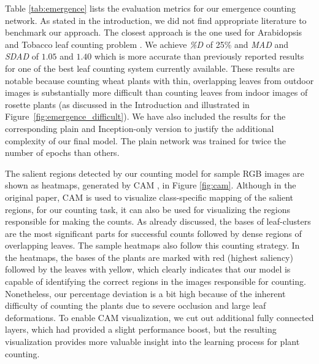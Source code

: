 \documentclass[10pt,twocolumn,letterpaper]{article}
\begin{document}
Table \ref{tab:emergence} lists the evaluation metrics for our emergence counting network. As stated in the introduction, we did not find appropriate literature to benchmark our approach. The closest approach is the one used for Arabidopsis and Tobacco leaf counting problem \cite{aich-cvppp2017}. %
We achieve \textit{\%D} of 25\% and \textit{MAD} and \textit{SDAD} of $1.05$ and $1.40$ which is more accurate than previously reported results for one of the best leaf counting system currently available. These results are notable because counting wheat plants with thin, overlapping leaves from outdoor images is substantially more difficult than counting leaves from indoor images of rosette plants (as discussed in the Introduction and illustrated in Figure~\ref{fig:emergence_difficult}). We have also included the results for the corresponding plain and Inception-only version to justify the additional complexity of our final model. The plain network was trained for twice the number of epochs than others.

The salient regions detected by our counting model for sample RGB images are shown as heatmaps, generated by CAM \cite{cam-mit}, in Figure \ref{fig:cam}. Although in the original paper, CAM is used to visualize class-specific mapping of the salient regions, for our counting task, it can also be used for visualizing the regions responsible for making the counts. As already discussed, the bases of leaf-clusters are the most significant parts for successful counts followed by dense regions of overlapping leaves. The sample heatmaps also follow this counting strategy. In the heatmaps, the bases of the plants are marked with red (highest saliency) followed by the leaves with yellow, which clearly indicates that our model is capable of identifying the correct regions in the images responsible for counting. Nonetheless, our percentage deviation is a bit high because of the inherent difficulty of counting the plants due to severe occlusion and large leaf deformations.
%
To enable CAM visualization, we cut out additional fully connected layers, which had provided a slight performance boost, but the resulting visualization provides more valuable insight into the learning process for plant counting.

\end{document}
